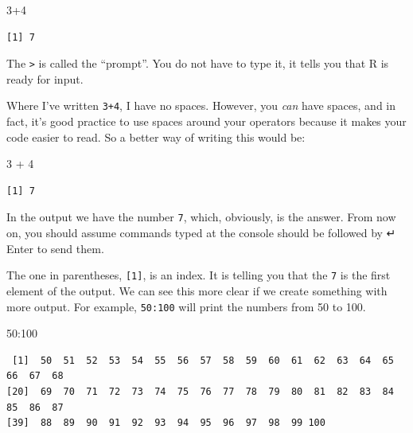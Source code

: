 \documentclass[
  letterpaper,
  DIV=11,
  numbers=noendperiod]{scrreprt}
\newenvironment{Shaded}{\begin{snugshade}}{\end{snugshade}}
\newcommand{\DecValTok}[1]{\textcolor[rgb]{0.68,0.00,0.00}{#1}}
\newcommand{\SpecialCharTok}[1]{\textcolor[rgb]{0.37,0.37,0.37}{#1}}
\begin{document}
\begin{Shaded}
\begin{Highlighting}[]
\DecValTok{3}\SpecialCharTok{+}\DecValTok{4}
\end{Highlighting}
\end{Shaded}

\begin{verbatim}
[1] 7
\end{verbatim}

The \texttt{\textgreater{}} is called the ``prompt''. You do not have to
type it, it tells you that R is ready for input.

Where I've written \texttt{3+4}, I have no spaces. However, you
\emph{can} have spaces, and in fact, it's good practice to use spaces
around your operators because it makes your code easier to read. So a
better way of writing this would be:

\begin{Shaded}
\begin{Highlighting}[]
\DecValTok{3} \SpecialCharTok{+} \DecValTok{4}
\end{Highlighting}
\end{Shaded}

\begin{verbatim}
[1] 7
\end{verbatim}

In the output we have the number \texttt{7}, which, obviously, is the
answer. From now on, you should assume commands typed at the console
should be followed by ↵ Enter to send them.

The one in parentheses, \texttt{{[}1{]}}, is an index. It is telling you
that the \texttt{7} is the first element of the output. We can see this
more clear if we create something with more output. For example,
\texttt{50:100} will print the numbers from 50 to 100.

\begin{Shaded}
\begin{Highlighting}[]
\DecValTok{50}\SpecialCharTok{:}\DecValTok{100}
\end{Highlighting}
\end{Shaded}

\begin{verbatim}
 [1]  50  51  52  53  54  55  56  57  58  59  60  61  62  63  64  65  66  67  68
[20]  69  70  71  72  73  74  75  76  77  78  79  80  81  82  83  84  85  86  87
[39]  88  89  90  91  92  93  94  95  96  97  98  99 100
\end{verbatim}
\end{document}
